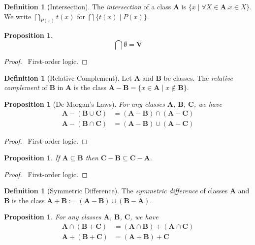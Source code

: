 \documentclass{book}
\let\qed\relax
\newtheorem{prop}[ax]{Proposition}
\theoremstyle{definition}
\newtheorem{df}[ax]{Definition}
\begin{document}
\begin{df}[Intersection]
The \emph{intersection} of a class $\mathbf{A}$ is $\{ x \mid \forall X \in \mathbf{A}. x \in X \}$. We write $\bigcap_{P(x)} t(x)$ for $\bigcap \{ t(x) \mid P(x) \}$.
\end{df}

\begin{prop}
\[ \bigcap \emptyset = \mathbf{V} \]
\end{prop}

\begin{proof}
\pf\ First-order logic. \qed
\end{proof}

\begin{df}[Relative Complement]
Let $\mathbf{A}$ and $\mathbf{B}$ be classes. The \emph{relative complement} of $\mathbf{B}$ in $\mathbf{A}$ is the class $\mathbf{A} - \mathbf{B} = \{ x \in \mathbf{A} \mid x \notin \mathbf{B} \}$.
\end{df}

\begin{prop}[De Morgan's Laws]
For any classes $\mathbf{A}$, $\mathbf{B}$, $\mathbf{C}$, we have
\begin{align*}
\mathbf{A} - (\mathbf{B} \cup \mathbf{C}) & = (\mathbf{A} - \mathbf{B}) \cap (\mathbf{A} - \mathbf{C}) \\
\mathbf{A} - (\mathbf{B} \cap \mathbf{C}) & = (\mathbf{A} - \mathbf{B}) \cup (\mathbf{A} - \mathbf{C})
\end{align*}
\end{prop}

\begin{proof}
\pf\ First-order logic. \qed
\end{proof}

\begin{prop}
If $\mathbf{A} \subseteq \mathbf{B}$ then $\mathbf{C} - \mathbf{B} \subseteq \mathbf{C} - \mathbf{A}$.
\end{prop}

\begin{proof}
\pf\ First-order logic. \qed
\end{proof}

\begin{df}[Symmetric Difference]
The \emph{symmetric difference} of classes $\mathbf{A}$ and $\mathbf{B}$ is the class $\mathbf{A} + \mathbf{B} := (\mathbf{A} - \mathbf{B}) \cup (\mathbf{B} - \mathbf{A})$.
\end{df}

\begin{prop}
For any classes $\mathbf{A}$, $\mathbf{B}$, $\mathbf{C}$, we have
\begin{align*}
\mathbf{A} \cap (\mathbf{B} + \mathbf{C}) & = (\mathbf{A} \cap \mathbf{B}) + (\mathbf{A} \cap \mathbf{C}) \\
\mathbf{A} + (\mathbf{B} + \mathbf{C}) & = (\mathbf{A} + \mathbf{B}) + \mathbf{C}
\end{align*}
\end{prop}
\end{document}

